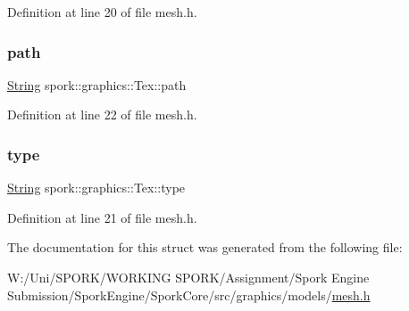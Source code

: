 Definition at line 20 of file mesh.\+h.

\mbox{\label{structspork_1_1graphics_1_1_tex_aa228db713a3b59e75744fa6c2fbe9bbe}} 
\subsubsection{\texorpdfstring{path}{path}}
{\footnotesize\ttfamily \hyperlink{my_string_8h_afbeda3fd1bdc8c37d01bdf9f5c8274ff}{String} spork\+::graphics\+::\+Tex\+::path}



Definition at line 22 of file mesh.\+h.

\mbox{\label{structspork_1_1graphics_1_1_tex_a2c191369d8f394295310e0b242513e65}} 
\subsubsection{\texorpdfstring{type}{type}}
{\footnotesize\ttfamily \hyperlink{my_string_8h_afbeda3fd1bdc8c37d01bdf9f5c8274ff}{String} spork\+::graphics\+::\+Tex\+::type}



Definition at line 21 of file mesh.\+h.



The documentation for this struct was generated from the following file\+:\begin{DoxyCompactItemize}
\item 
W\+:/\+Uni/\+S\+P\+O\+R\+K/\+W\+O\+R\+K\+I\+N\+G S\+P\+O\+R\+K/\+Assignment/\+Spork Engine Submission/\+Spork\+Engine/\+Spork\+Core/src/graphics/models/\hyperlink{mesh_8h}{mesh.\+h}\end{DoxyCompactItemize}
